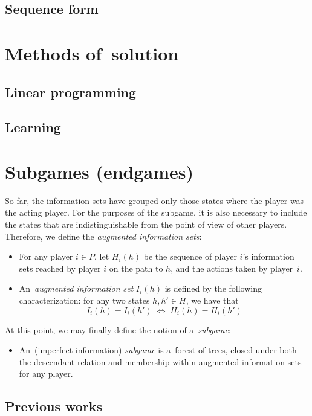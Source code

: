 \subsection{Sequence form}

\section{Methods of~solution}

\subsection{Linear programming}

\subsection{Learning}

\section{Subgames (endgames)}

So far, the information sets have grouped only those states where the player was the acting player.
For the purposes of the subgame, it is also necessary to include the states that are indistinguishable from the point of view of other players.
Therefore, we define the \emph{augmented information sets}:~\cite{BurchJohansonBowling13}

\begin{itemize}
  \item For any player $i \in P$, let $H_i(h)$ be the sequence of player $i$'s information sets reached by player $i$ on the path to $h$, and the actions taken by player~$i$.
  \item An~\emph{augmented information set} $I_i(h)$ is defined by the following characterization:
    for any two states $h, h' \in H$, we have that 
    \[ I_i (h) = I_i (h') \; \Longleftrightarrow \; H_i (h) = H_i (h') \]
\end{itemize}

At this point, we may finally define the notion of a~\emph{subgame}:

\begin{itemize}
  \item An~(imperfect information) \emph{subgame} is a~forest of trees, closed under both the descendant relation and membership within augmented information sets for any player.~\cite{BurchJohansonBowling13}
\end{itemize}

\subsection{Previous works}
